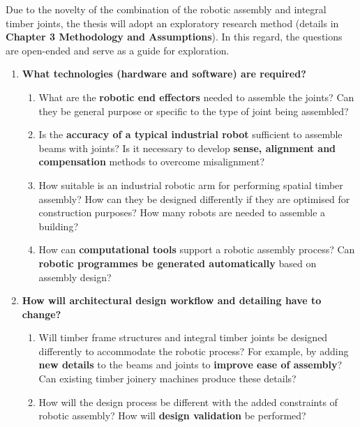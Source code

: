 Due to the novelty of the combination of the robotic assembly and integral timber joints, the thesis will adopt an exploratory research method (details in \textbf{Chapter 3 Methodology and Assumptions}). In this regard, the questions are open-ended and serve as a guide for exploration. 

\begin{enumerate}
	\item \textbf{What technologies (hardware and software) are required?}

    \begin{enumerate}
    	\item What are the \textbf{robotic end effectors} needed to assemble the joints? Can they be general purpose or specific to the type of joint being assembled?
    
    	\item Is the \textbf{accuracy of a typical industrial robot }sufficient to assemble beams with joints? Is it necessary to develop \textbf{sense, alignment and compensation }methods to overcome misalignment?
    
    	\item How suitable is an industrial robotic arm for performing spatial timber assembly? How can they be designed differently if they are optimised for construction purposes? How many robots are needed to assemble a building?
    
    	\item How can \textbf{computational tools }support a robotic assembly process? Can \textbf{robotic programmes be generated automatically} based on assembly design?
    
    \end{enumerate}
    
    \item \textbf{How will architectural design workflow and detailing have to change?}

    \begin{enumerate}
    	\item Will timber frame structures and integral timber joints be designed differently to accommodate the robotic process? For example, by adding \textbf{new details }to the beams and joints to \textbf{improve ease of assembly}? Can existing timber joinery machines produce these details?
    
    	\item How will the design process be different with the added constraints of robotic assembly? How will \textbf{design validation }be performed?
    

\end{enumerate}
\end{enumerate}
